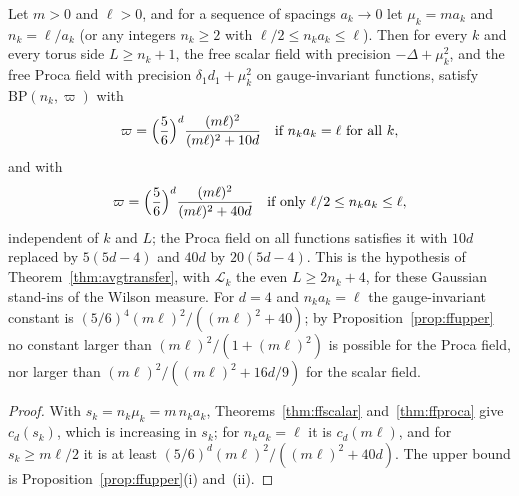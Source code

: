 \begin{corollary}\label{cor:ffuniform}
Let $m>0$ and $\ell>0$, and for a sequence of spacings $a_k\to0$ let $\mu_k=
ma_k$ and $n_k=\ell/a_k$ (or any integers $n_k\ge2$ with $\ell/2\le n_ka_k
\le\ell$). Then for every $k$ and every torus side $L\ge n_k+1$, the free
scalar field with precision $-\Delta+\mu_k^2$, and the free Proca field with
precision $\delta_1d_1+\mu_k^2$ on gauge-invariant functions, satisfy
$\mathrm{BP}(n_k,\varpi)$ with
\[
\varpi=\Bigl(\frac56\Bigr)^d\frac{(m\ell)^2}{(m\ell)^2+10d}\quad\text{if }
n_ka_k=\ell\text{ for all }k,
\]
and with
\[
\varpi=\Bigl(\frac56\Bigr)^d\frac{(m\ell)^2}{(m\ell)^2+40d}\quad\text{if only }
\ell/2\le n_ka_k\le\ell,
\]
independent of $k$ and $L$; the Proca field on all functions satisfies it
with $10d$ replaced by $5(5d-4)$ and $40d$ by $20(5d-4)$. This is the
hypothesis of Theorem~\ref{thm:avgtransfer}, with $\mathcal L_k$ the even
$L\ge2n_k+4$, for these Gaussian stand-ins of the Wilson measure. For $d=4$
and $n_ka_k=\ell$ the gauge-invariant constant is $(5/6)^4(m\ell)^2/((m\ell)^2
+40)$; by Proposition~\ref{prop:ffupper} no constant larger than
$(m\ell)^2/(1+(m\ell)^2)$ is possible for the Proca field, nor larger than
$(m\ell)^2/((m\ell)^2+16d/9)$ for the scalar field.
\end{corollary}

\begin{proof}
With $s_k=n_k\mu_k=m\,n_ka_k$, Theorems~\ref{thm:ffscalar}
and~\ref{thm:ffproca} give $c_d(s_k)$, which is increasing in $s_k$; for
$n_ka_k=\ell$ it is $c_d(m\ell)$, and for $s_k\ge m\ell/2$ it is at least
$(5/6)^d(m\ell)^2/((m\ell)^2+40d)$. The upper bound is
Proposition~\ref{prop:ffupper}(i) and~(ii).
\end{proof}

